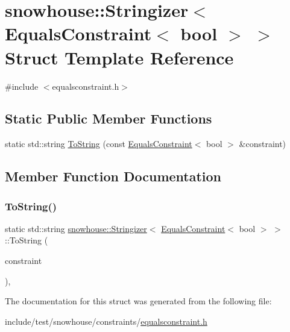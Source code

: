 \hypertarget{structsnowhouse_1_1Stringizer_3_01EqualsConstraint_3_01bool_01_4_01_4}{}\section{snowhouse\+::Stringizer$<$ Equals\+Constraint$<$ bool $>$ $>$ Struct Template Reference}
\label{structsnowhouse_1_1Stringizer_3_01EqualsConstraint_3_01bool_01_4_01_4}


{\ttfamily \#include $<$equalsconstraint.\+h$>$}

\subsection*{Static Public Member Functions}
\begin{DoxyCompactItemize}
\item 
static std\+::string \mbox{\hyperlink{structsnowhouse_1_1Stringizer_3_01EqualsConstraint_3_01bool_01_4_01_4_ae8af445de307b32e3f29949c56df222f}{To\+String}} (const \mbox{\hyperlink{structsnowhouse_1_1EqualsConstraint}{Equals\+Constraint}}$<$ bool $>$ \&constraint)
\end{DoxyCompactItemize}


\subsection{Member Function Documentation}
\mbox{\label{structsnowhouse_1_1Stringizer_3_01EqualsConstraint_3_01bool_01_4_01_4_ae8af445de307b32e3f29949c56df222f}} 
\subsubsection{\texorpdfstring{ToString()}{ToString()}}
{\footnotesize\ttfamily static std\+::string \mbox{\hyperlink{structsnowhouse_1_1Stringizer}{snowhouse\+::\+Stringizer}}$<$ \mbox{\hyperlink{structsnowhouse_1_1EqualsConstraint}{Equals\+Constraint}}$<$ bool $>$ $>$\+::To\+String (\begin{DoxyParamCaption}\item[{const \mbox{\hyperlink{structsnowhouse_1_1EqualsConstraint}{Equals\+Constraint}}$<$ bool $>$ \&}]{constraint }\end{DoxyParamCaption})\hspace{0.3cm}{\ttfamily [inline]}, {\ttfamily [static]}}



The documentation for this struct was generated from the following file\+:\begin{DoxyCompactItemize}
\item 
include/test/snowhouse/constraints/\mbox{\hyperlink{equalsconstraint_8h}{equalsconstraint.\+h}}\end{DoxyCompactItemize}
